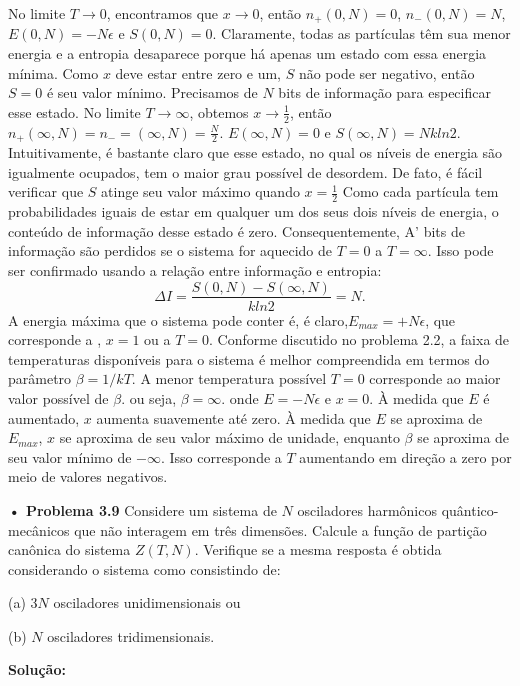 \documentclass[12pt]{article}
\begin{document}
No limite $T \to 0$, encontramos que $x \to 0$, então $n_{+}(0, N) = 0$, $ n_{-}(0, N) = N$, $E(0, N) = -N \epsilon$ e $S(0, N) = 0$. Claramente, todas as partículas têm sua menor energia e a entropia desaparece porque há apenas um estado com essa energia mínima. Como $x$ deve estar entre zero e um, $S$ não pode ser negativo, então $S = 0$ é seu valor mínimo. Precisamos de $N$ bits de informação para especificar esse estado.
No limite $T \to \infty$, obtemos $x \to \frac{1}{2}$, então $n_{+}(\infty,  N) = n_{-} = (\infty, N) = \frac{N}{2}$. $E(\infty, N) = 0$ e $S(\infty, N) = N k ln2$. Intuitivamente, é bastante claro que esse estado, no qual os níveis de energia são igualmente ocupados, tem o maior grau possível de desordem. De fato, é fácil verificar que $S$ atinge seu valor máximo quando $x = \frac{1}{2}$ Como cada partícula tem probabilidades iguais de estar em qualquer um dos seus dois níveis de energia, o conteúdo de informação desse estado é zero. Consequentemente, A' bits de informação são perdidos se o sistema for aquecido de $T = 0$ a $T = \infty$. Isso pode ser confirmado usando a relação entre informação e entropia:
\begin{equation}
\Delta I = \frac{S(0, N) - S(\infty, N)}{k ln 2} = N.
\end{equation}
A energia máxima que o sistema pode conter é, é claro,$ E_{max} = +N\epsilon$, que corresponde a , $x = 1$ ou a $T = 0$. Conforme discutido no problema 2.2, a faixa de temperaturas disponíveis para o sistema é melhor compreendida em termos do parâmetro $\beta = 1/kT$. A menor temperatura possível $T=0$ corresponde ao maior valor possível de $\beta$. ou seja, $\beta = \infty$. onde $E = - N \epsilon$ e $x = 0$. À medida que $E$ é aumentado, $x$ aumenta suavemente até zero. À medida que $E$ se aproxima de $E_{max}$, $x$ se aproxima de seu valor máximo de unidade, enquanto $\beta$ se aproxima de seu valor mínimo de $-\infty$. Isso corresponde a $T$ aumentando em direção a zero por meio de valores negativos.

\textbf{• Problema 3.9} Considere um sistema de $N$ osciladores harmônicos quântico-mecânicos que não interagem em três dimensões. Calcule a função de partição canônica do sistema $Z(T, N)$. Verifique se a mesma resposta é obtida considerando o sistema como consistindo de:

(a) $3N$ osciladores unidimensionais ou

(b) $N$ osciladores tridimensionais.

\textbf{Solução:}\\
\end{document}
